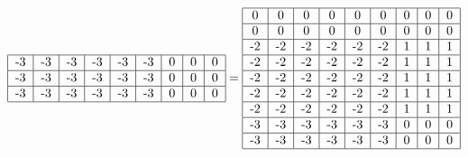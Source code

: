 \documentclass{article}
\begin{document}
\begin{equation}
\begin{tabular}{ | c | c | c | c | c | c | c | c | c | }
        \hline
        -3 & -3 & -3 & -3 & -3 & -3 & 0 & 0 & 0 \\ 
        \hline
        -3 & -3 & -3 & -3 & -3 & -3 & 0 & 0 & 0 \\ 
        \hline
        -3 & -3 & -3 & -3 & -3 & -3 & 0 & 0 & 0 \\ 
        \hline
    \end{tabular} = 
    \begin{tabular}{ | c | c | c | c | c | c | c | c | c | }
        \hline
        0 & 0 & 0 & 0 & 0 & 0 & 0 & 0 & 0 \\ 
        \hline
        0 & 0 & 0 & 0 & 0 & 0 & 0 & 0 & 0 \\ 
        \hline
        -2 & -2 & -2 & -2 & -2 & -2 & 1 & 1 & 1 \\ 
        \hline
        -2 & -2 & -2 & -2 & -2 & -2 & 1 & 1 & 1 \\ 
        \hline
        -2 & -2 & -2 & -2 & -2 & -2 & 1 & 1 & 1 \\ 
        \hline
        -2 & -2 & -2 & -2 & -2 & -2 & 1 & 1 & 1 \\ 
        \hline
        -2 & -2 & -2 & -2 & -2 & -2 & 1 & 1 & 1 \\ 
        \hline
        -3 & -3 & -3 & -3 & -3 & -3 & 0 & 0 & 0 \\ 
        \hline
        -3 & -3 & -3 & -3 & -3 & -3 & 0 & 0 & 0 \\ 
        \hline
    \end{tabular}
\end{equation}
\end{document}

